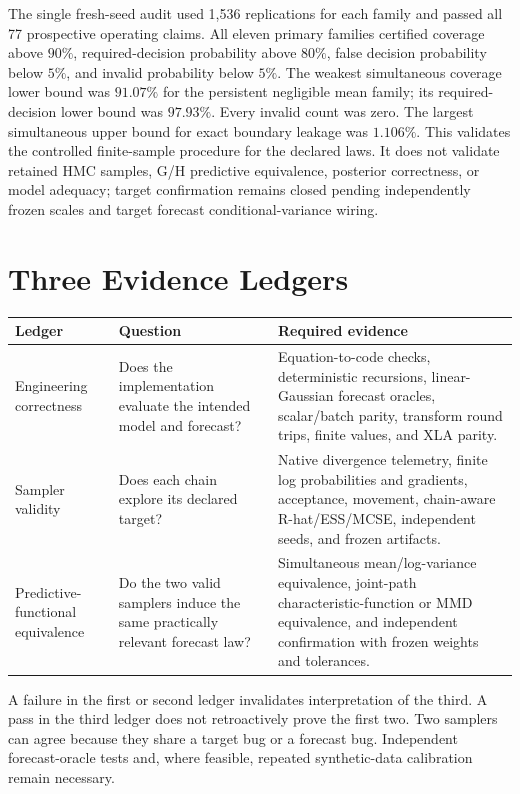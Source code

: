 The single fresh-seed audit used 1,536 replications for each family and passed
all 77 prospective operating claims.  All eleven primary families certified
coverage above $90\%$, required-decision probability above $80\%$, false
decision probability below $5\%$, and invalid probability below $5\%$.  The
weakest simultaneous coverage lower bound was $91.07\%$ for the persistent
negligible mean family; its required-decision lower bound was $97.93\%$.
Every invalid count was zero.  The largest simultaneous upper bound for exact
boundary leakage was $1.106\%$.  This validates the controlled finite-sample
procedure for the declared laws.  It does not validate retained HMC samples,
G/H predictive equivalence, posterior correctness, or model adequacy; target
confirmation remains closed pending independently frozen scales and target
forecast conditional-variance wiring.

\section{Three Evidence Ledgers}
\label{sec:bf-ssl-lstm-three-ledgers}

\begin{center}
\begin{tabular}{p{}p{}p{}}
\toprule
Ledger & Question & Required evidence \\
\midrule
Engineering correctness & Does the implementation evaluate the intended
model and forecast? & Equation-to-code checks, deterministic recursions,
linear-Gaussian forecast oracles, scalar/batch parity, transform round trips,
finite values, and XLA parity. \\
Sampler validity & Does each chain explore its declared target? & Native
divergence telemetry, finite log probabilities and gradients, acceptance,
movement, chain-aware R-hat/ESS/MCSE, independent seeds, and frozen artifacts.
\\
Predictive-functional equivalence & Do the two valid samplers induce the same
practically relevant forecast law? & Simultaneous mean/log-variance
equivalence, joint-path characteristic-function or MMD equivalence, and
independent confirmation with frozen weights and tolerances. \\
\bottomrule
\end{tabular}
\end{center}

A failure in the first or second ledger invalidates interpretation of the
third.  A pass in the third ledger does not retroactively prove the first two.
Two samplers can agree because they share a target bug or a forecast bug.
Independent forecast-oracle tests and, where feasible, repeated synthetic-data
calibration remain necessary.

